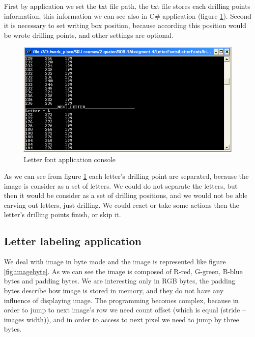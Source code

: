 First by application we set the txt file path, the txt file stores each drilling points information, this information we can see also in C\# application (figure \ref{fig:letterconsole}). Second it is necessary to set writing box position, because according this position would be wrote drilling points, and other settings are optional. 

\begin{figure}[H]
  \centering
  \includegraphics[scale= 0.6]{source/letterconsole.png}
  \caption{Letter font application console}
  \label{fig:letterconsole}
\end{figure}

As we can see from figure \ref{fig:letterconsole} each letter’s drilling point are separated, because the image is consider as a set of letters. We could do not separate the letters, but then it would be consider as a set of drilling positions, and we would not be able carving out letters, just drilling. We could react or take some actions then the letter’s drilling points finish, or skip it.

\subsection{Letter labeling application}
We deal with image in byte mode and the image is represented like figure \ref{fig:imagebyte}. As we can see the image is composed of R-red, G-green, B-blue bytes and padding bytes. We are interesting only in RGB bytes, the padding bytes describe how image is stored in memory, and they do not have any influence of displaying image. The programming becomes complex, because in order to jump to next image’s row we need count offset (which is equal (stride – images width)), and in order to access to next pixel we need to jump by three bytes.

